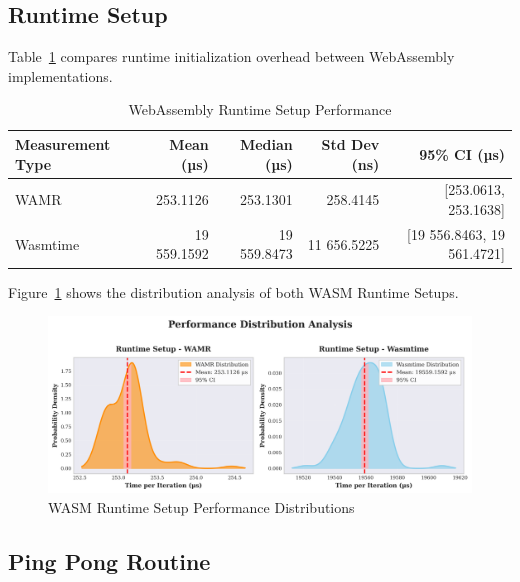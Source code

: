\subsection{Runtime Setup}
\label{subsec:wasm-setup-performance}

Table~\ref{tab:wasm-setup-performance} compares runtime initialization overhead between WebAssembly implementations.

\begin{table}[h]
    \centering
    \caption{WebAssembly Runtime Setup Performance}
    \label{tab:wasm-setup-performance}
    \begin{tabular}{lrrrr}
        \toprule
        \textbf{Measurement Type} & \textbf{Mean (µs)} & \textbf{Median (µs)} & \textbf{Std Dev (ns)} & \textbf{95\% CI (µs)} \\
        \midrule
        WAMR          & 253.1126 & 253.1301 & 258.4145 & [253.0613, 253.1638] \\
        Wasmtime      & 19 559.1592 & 19 559.8473 & 11 656.5225 & [19 556.8463, 19 561.4721] \\
        \bottomrule
    \end{tabular}
\end{table}

Figure~\ref{fig:wasm-setup-distributions} shows the distribution analysis of both \acrshort{WASM} Runtime Setups.

\begin{figure}[h]
    \centering
    \includegraphics[width=\textwidth]{images/wasm-rt-distributions}
    \caption{\acrshort{WASM} Runtime Setup Performance Distributions}
    \label{fig:wasm-setup-distributions}
\end{figure}



\subsection{Ping Pong Routine}
\label{subsec:wasm-execution-performance}

